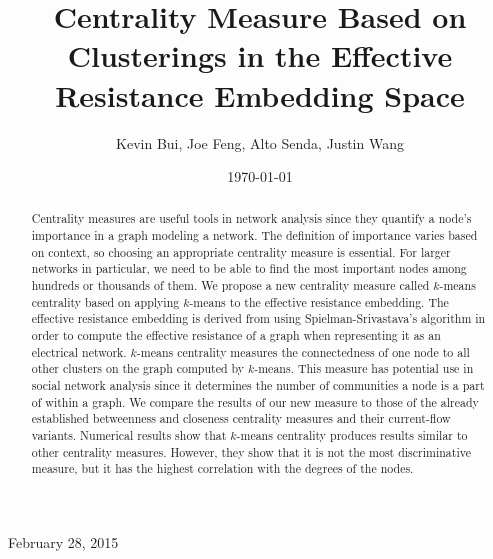 \documentclass[10pt]{siamltex}
\begin{document}
\begin{pagewiselinenumbers}
\title{Centrality Measure Based on Clusterings in the Effective Resistance Embedding Space}
\author{Kevin Bui\footnotemark[1], Joe Feng\footnotemark[1], Alto Senda\footnotemark[1], Justin Wang\footnotemark[1]  }
\date{ \today}
\maketitle

\begin{center}
     February 28, 2015
\end{center}

\vspace{5mm}

\begin{abstract}
Centrality measures are useful tools in network analysis since they quantify a node's importance in a graph modeling a network. The definition of importance varies based on context, so choosing an appropriate centrality measure is essential. For larger networks in particular, we need to be able to find the most important nodes among hundreds or thousands of them. We propose a new centrality measure called $k$-means centrality based on applying $k$-means to the effective resistance embedding. The effective resistance embedding is derived from using Spielman-Srivastava's algorithm \cite{Spielman2011} in order to compute the effective resistance of a graph when representing it as an electrical network. $k$-means centrality measures the connectedness of one node to all other clusters on the graph computed by $k$-means. This measure has potential use in social network analysis since it determines the number of communities a node is a part of within a graph. We compare the results of our new measure to those of the already established betweenness and closeness centrality measures and their current-flow variants. Numerical results show that $k$-means centrality produces results similar to other centrality measures. However, they show that it is not the most discriminative measure, but it has the highest correlation with the degrees of the nodes. 
\end{abstract}



\end{pagewiselinenumbers}
\end{document}
